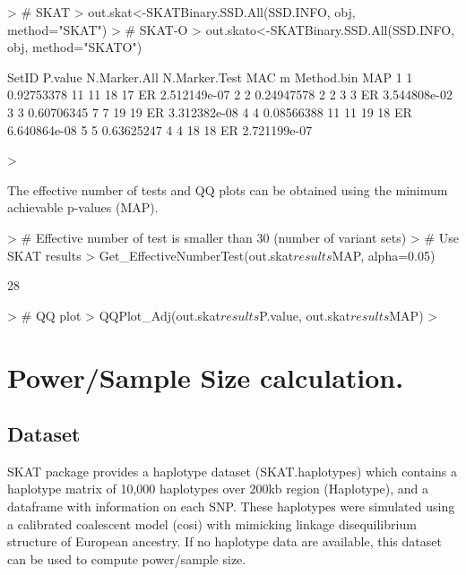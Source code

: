\documentclass[11pt]{article}
\begin{document}
\begin{Schunk}
\begin{Sinput}
> # SKAT
> out.skat<-SKATBinary.SSD.All(SSD.INFO, obj, method="SKAT")
> # SKAT-O
> out.skato<-SKATBinary.SSD.All(SSD.INFO, obj, method="SKATO")
\end{Sinput}
\end{Schunk}

\begin{Schunk}
\begin{Soutput}
  SetID    P.value N.Marker.All N.Marker.Test MAC  m Method.bin          MAP
1     1 0.92753378           11            11  18 17         ER 2.512149e-07
2     2 0.24947578            2             2   3  3         ER 3.544808e-02
3     3 0.60706345            7             7  19 19         ER 3.312382e-08
4     4 0.08566388           11            11  19 18         ER 6.640864e-08
5     5 0.63625247            4             4  18 18         ER 2.721199e-07
\end{Soutput}
\begin{Sinput}
> 
\end{Sinput}
\end{Schunk}

The effective number of tests and QQ plots can be obtained using the minimum achievable p-values (MAP).


\begin{Schunk}
\begin{Sinput}
> # Effective number of test is smaller than 30 (number of variant sets)
> # Use SKAT results
> Get_EffectiveNumberTest(out.skat$results$MAP, alpha=0.05)
\end{Sinput}
\begin{Soutput}
[1] 28
\end{Soutput}
\begin{Sinput}
> # QQ plot
> QQPlot_Adj(out.skat$results$P.value, out.skat$results$MAP)
> 
\end{Sinput}
\end{Schunk}



\section{Power/Sample Size calculation.}


\subsection{Dataset}
SKAT package provides a haplotype dataset (SKAT.haplotypes) 
which contains a haplotype matrix of 10,000 haplotypes over 200kb region (Haplotype), 
and a dataframe with information on each SNP. 
These haplotypes were simulated using a calibrated coalescent model (cosi) with mimicking 
linkage disequilibrium structure of European ancestry. 
If no haplotype data are available, this dataset can be used to compute power/sample size.
\end{document}
